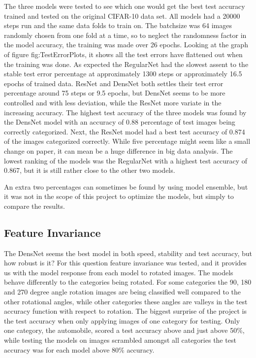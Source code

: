The three models were tested to see which one would get the best test accuracy trained and tested on the original CIFAR-10 data set. All models had a 20000 steps run and the same data folds to train on. The batchsize was 64 images randomly chosen from one fold at a time, so to neglect the randomness factor in the model accuracy, the training was made over 26 epochs. Looking at the graph of figure fig:TestErrorPlots, it shows all the test errors have flattened out when the training was done. As expected the RegularNet had the slowest assent to the stable test error percentage at approximately 1300 steps or approximately 16.5 epochs of trained data. ResNet and DensNet both settles their test error percentage around 75 steps or 9.5 epochs, but DensNet seems to be more controlled and with less deviation, while the ResNet more variate in the increasing accuracy. The highest test accuracy of the three models was found by the DensNet model with an accuracy of 0.88 percentage of test images being correctly categorized. Next, the ResNet model had a best test accuracy of 0.874 of the images categorized correctly. While five percentage might seem like a small change on paper, it can mean be a huge difference in big data analysis. The lowest ranking of the models was the RegularNet with a highest test accuracy of 0.867, but it is still rather close to the other two models.

An extra two percentages can sometimes be found by using model ensemble, but it was not in the scope of this project to optimize the models, but simply to compare the results.

\subsection{Feature Invariance}

The DensNet seems the best model in both speed, stability and test accuracy, but how robust is it? For this question feature invariance was tested, and it provides us with the model response from each model to rotated images. The models behave differently to the categories being rotated. For some categories the 90, 180 and 270 degree angle rotation images are being classified well compared to the other rotational angles, while other categories these angles are valleys in the test accuracy function with respect to rotation. The biggest surprise of the project is the test accuracy when only applying images of one category for testing. Only one category, the automobile, scored a test accuracy above and just above 50\%, while testing the models on images scrambled amongst all categories the test accuracy was for each model above 80\% accuracy.

